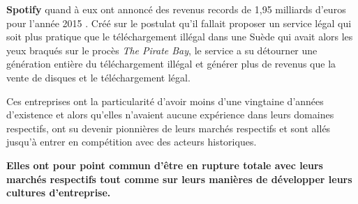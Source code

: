 \vspace{5mm}

\textbf{Spotify} quand à eux ont annoncé des revenus records de 1,95 milliards d'euros pour l'année 2015 \supercite{SpotifyChiffres2015}. Créé sur le postulat qu'il fallait proposer un service légal qui soit plus pratique que le téléchargement illégal dans une Suède qui avait alors les yeux braqués sur le procès \textit{The Pirate Bay}, le service a su détourner une génération entière du téléchargement illégal et générer plus de revenus que la vente de disques et le téléchargement légal.

\vspace{5mm}

Ces entreprises ont la particularité d'avoir moins d'une vingtaine d'années d'existence et alors qu'elles n'avaient aucune expérience dans leurs domaines respectifs, ont su devenir pionnières de leurs marchés respectifs et sont allés jusqu'à entrer en compétition avec des acteurs historiques.

\textbf{Elles ont pour point commun d'être en rupture totale avec leurs marchés respectifs tout comme sur leurs manières de développer leurs cultures d'entreprise.}